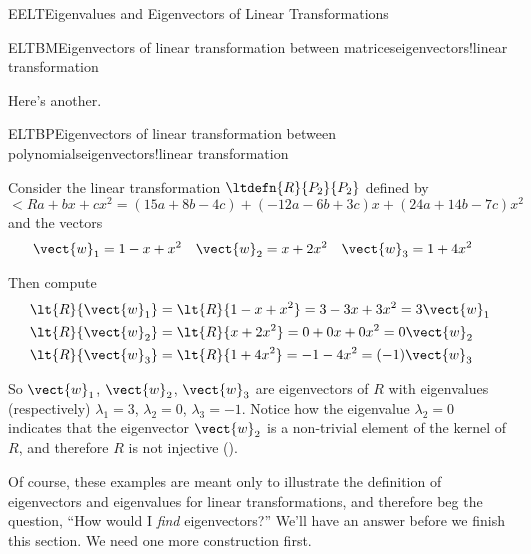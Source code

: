\begin{subsect}{EELT}{Eigenvalues and Eigenvectors of Linear Transformations}
\begin{example}{ELTBM}{Eigenvectors of linear transformation between matrices}{eigenvectors!linear transformation}
%
\end{example}
%
\begin{para}Here's another.\end{para}
%
\begin{example}{ELTBP}{Eigenvectors of linear transformation between polynomials}{eigenvectors!linear transformation}
%
\begin{para}Consider the linear transformation $\ltdefn{R}{P_2}{P_2}$ defined by
%
\begin{equation*}
\lt{R}{a+bx+cx^2}=
(15a+8b-4c)+(-12a-6b+3c)x+(24a+14b-7c)x^2
\end{equation*}
%
and the vectors
%
%
\begin{align*}
\vect{w}_1
&=1-x+x^2
&
%
\vect{w}_2
&=x+2x^2
&
%
\vect{w}_3
&=1+4x^2
&
%
\end{align*}
\end{para}
%
\begin{para}Then compute
%
\begin{align*}
\lt{R}{\vect{w}_1}
&=
\lt{R}{1-x+x^2}
=
3-3x+3x^2
=3\vect{w}_1\\
%
\lt{R}{\vect{w}_2}
&=
\lt{R}{x+2x^2}
=
0+0x+0x^2
=0\vect{w}_2\\
%
\lt{R}{\vect{w}_3}
&=
\lt{R}{1+4x^2}
=
-1-4x^2
=(-1)\vect{w}_3\\
%
\end{align*}
\end{para}
%
\begin{para}So $\vect{w}_1$, $\vect{w}_2$, $\vect{w}_3$ are eigenvectors of $R$ with eigenvalues (respectively) $\lambda_1=3$, $\lambda_2=0$, $\lambda_3=-1$.  Notice how the eigenvalue $\lambda_2=0$ indicates that the eigenvector $\vect{w}_2$ is a non-trivial element of the kernel of $R$, and therefore $R$ is not injective ().\end{para}
%
\end{example}
%
\begin{para}Of course, these examples are meant only to illustrate the definition of eigenvectors and eigenvalues for linear transformations, and therefore beg the question, ``How would I {\em find} eigenvectors?''  We'll have an answer before we finish this section.  We need one more construction first.\end{para}
%
%
\end{subsect}
%
